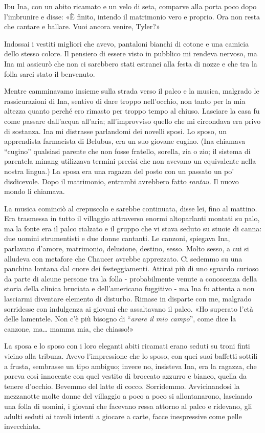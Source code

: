 Ibu Ina, con un abito ricamato e un velo di seta, comparve alla porta
poco dopo l'imbrunire e disse: «È finito, intendo il matrimonio vero e
proprio. Ora non resta che cantare e ballare. Vuoi ancora venire,
Tyler?»

Indossai i vestiti migliori che avevo, pantaloni bianchi di cotone e una
camicia dello stesso colore. Il pensiero di essere visto in pubblico mi
rendeva nervoso, ma Ina mi assicurò che non ci sarebbero stati estranei
alla festa di nozze e che tra la folla sarei stato il benvenuto.

Mentre camminavamo insieme sulla strada verso il palco e la musica,
malgrado le rassicurazioni di Ina, sentivo di dare troppo nell'occhio,
non tanto per la mia altezza quanto perché ero rimasto per troppo tempo
al chiuso. Lasciare la casa fu come passare dall'acqua all'aria;
all'improvviso quello che mi circondava era privo di sostanza. Ina mi
distrasse parlandomi dei novelli sposi. Lo sposo, un apprendista
farmacista di Belubus, era un suo giovane cugino. (Ina chiamava
``cugino'' qualsiasi parente che non fosse fratello, sorella, zia o zio;
il sistema di parentela minang utilizzava termini precisi che non
avevano un equivalente nella nostra lingua.) La sposa era una ragazza
del posto con un passato un po' disdicevole. Dopo il matrimonio,
entrambi avrebbero fatto \emph{rantau}. Il nuovo mondo li chiamava.

La musica cominciò al crepuscolo e sarebbe continuata, disse lei, fino
al mattino. Era trasmessa in tutto il villaggio attraverso enormi
altoparlanti montati su palo, ma la fonte era il palco rialzato e il
gruppo che vi stava seduto su stuoie di canna: due uomini strumentisti e
due donne cantanti. Le canzoni, spiegava Ina, parlavano d'amore,
matrimonio, delusione, destino, sesso. Molto sesso, a cui si alludeva
con metafore che Chaucer avrebbe apprezzato. Ci sedemmo su una panchina
lontana dal cuore dei festeggiamenti. Attirai più di uno sguardo curioso
da parte di alcune persone tra la folla - probabilmente venute a
conoscenza della storia della clinica bruciata e dell'americano
fuggitivo - ma Ina fu attenta a non lasciarmi diventare elemento di
disturbo. Rimase in disparte con me, malgrado sorridesse con indulgenza
ai giovani che assaltavano il palco. «Ho superato l'età delle lamentele.
Non c'è più bisogno di ``\emph{arare il mio campo}'', come dice la
canzone, ma\ldots{} mamma mia, che chiasso!»

La sposa e lo sposo con i loro eleganti abiti ricamati erano seduti su
troni finti vicino alla tribuna. Avevo l'impressione che lo sposo, con
quei suoi baffetti sottili a frusta, sembrasse un tipo ambiguo; invece
no, insisteva Ina, era la ragazza, che pareva così innocente con quel
vestito di broccato azzurro e bianco, quella da tenere d'occhio. Bevemmo
del latte di cocco. Sorridemmo. Avvicinandosi la mezzanotte molte donne
del villaggio a poco a poco si allontanarono, lasciando una folla di
uomini, i giovani che facevano ressa attorno al palco e ridevano, gli
adulti seduti ai tavoli intenti a giocare a carte, facce inespressive
come pelle invecchiata.

